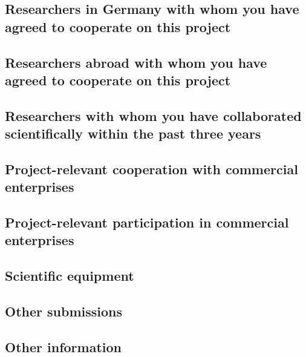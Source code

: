 \documentclass{scrartcl}
\begin{document}
\subsection{Researchers in Germany with whom you have agreed to cooperate on this project}

\subsection{Researchers abroad with whom you have agreed to cooperate on this project}

\subsection{Researchers with whom you have collaborated scientifically within the past three years}

\subsection{Project-relevant cooperation with commercial enterprises}

\subsection{Project-relevant participation in commercial enterprises}

\subsection{Scientific equipment}

\subsection{Other submissions}

\subsection{Other information}
\end{document}
